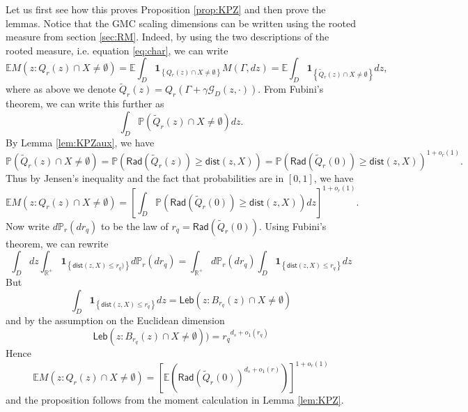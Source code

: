 \documentclass[11pt]{amsart}
\newcommand{\R}{\mathbb R}
\newcommand{\G}{\mathcal G}
\newcommand{\E}{\mathbb E}
\newcommand{\I}[1]{\mathbf{1}_{\left \{#1\right \}}}
\renewcommand{\P}{\mathbb P}
\renewcommand{\1}{\mathbf 1}
\newcommand{\Leb}{\mathsf{Leb}}
\newcommand{\dist}{\mathsf{dist}}
\newcommand{\radS}{\mathsf{Rad}}
\begin{document}
Let us first see how this proves Proposition \ref{prop:KPZ} and then prove the lemmas. Notice that the GMC scaling dimensions can be written using the rooted measure from section \ref{sec:RM}. Indeed, by using the two descriptions of the rooted measure, i.e. equation \eqref{eq:char}, we can write
$$\E M(z: Q_r(z) \cap X \neq \emptyset) = \E \int_D \I{Q_r(z) \cap X \neq \emptyset}M(\Gamma,dz) = \E \int_D \I{\tilde Q_r(z) \cap X \neq \emptyset}dz,$$
where as above we denote $\tilde Q_r(z) = Q_r(\Gamma + \gamma \G_D(z,\cdot))$. From Fubini's theorem, we can write this further as $$\int_D \P(\tilde Q_r(z) \cap X \neq \emptyset)dz.$$
By Lemma \ref{lem:KPZaux}, we have
$$\P(\tilde Q_r(z) \cap X \neq \emptyset) = \P\left(\radS(\tilde Q_r(z)) \geq \dist (z,X)\right) = \P\left(\radS(\tilde Q_r(0)) \geq \dist (z,X)\right)^{1+o_r(1)}.$$
Thus by Jensen's inequality and the fact that probabilities are in $[0,1]$, we have
$$\E M(z: Q_r(z) \cap X \neq \emptyset) = \left[\int_D \P\left(\radS(\tilde Q_r(0)) \geq \dist (z,X)\right)dz\right]^{1+o_r(1)}.$$
Now write $d\P_r(dr_q)$ to be the law of $r_q = \radS (\tilde Q_r(0))$. Using Fubini's theorem, we can rewrite 
$$\int_D dz \int_{\R^+} \I{\dist(z,X) \leq r_q)}d\P_r(dr_q) = \int_{\R^+} d\P_r(dr_q) \int_D \I{\dist(z,X) \leq r_q}dz$$
But $$\int_D \I{\dist(z,X) \leq r_q}dz = \Leb(z: B_{r_q}(z) \cap X \neq \emptyset)$$ and by the assumption on the Euclidean dimension
$$\Leb(z: B_{r_q}(z) \cap X \neq \emptyset)) = {r_q}^{d_s+o_1(r_q)}$$
Hence 
$$\E M(z: Q_r(z) \cap X \neq \emptyset) = \left[\E(\radS (\tilde Q_r(0))^{d_s+o_1(r)})\right]^{1+o_r(1)}$$
and the proposition follows from the moment calculation in Lemma \ref{lem:KPZ}.
\end{document}
